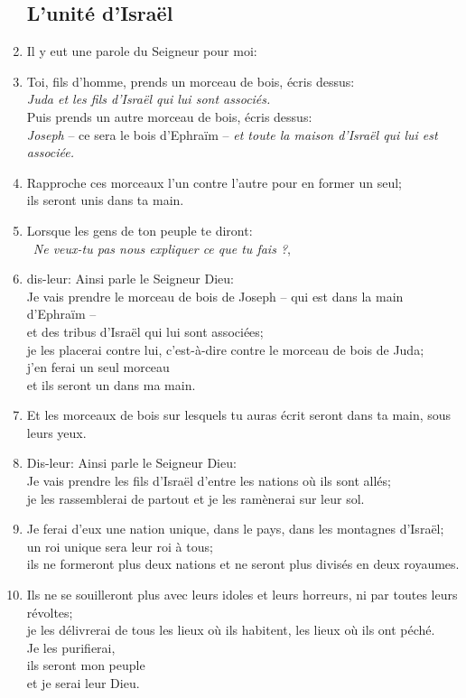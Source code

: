 \documentclass[12pt,a4paper,titlepage]{article}
\def \pslabelsep{0.2em} %
\def \psleftmargin{0em} %
\begin{document}
\begin{enumerate}[leftmargin=\psleftmargin, labelsep = \pslabelsep, label={\arabic*}, font=\color{\pscolor}\small\textsuperscript, parsep=0em, itemsep=0em, topsep=0em ]
\subsection*{L'unité d'Israël}
\item Il y eut une parole du Seigneur pour moi:
\item Toi, fils d’homme, prends un morceau de bois, écris dessus: \\ 
\decalage \emph{Juda et les fils d’Israël qui lui sont associés.} \\ Puis prends un autre morceau de bois, écris dessus: \\ \decalage \emph{Joseph} – ce sera le bois d’Ephraïm – \emph{et toute la maison d’Israël qui lui est associée.}
\item Rapproche ces morceaux l’un contre l’autre pour en former un seul; \\ ils seront unis dans ta main.
\item Lorsque les gens de ton peuple te diront: \\ \decalage \og{}\emph{Ne veux-tu pas nous expliquer ce que tu fais ?}\fg{},
 \item dis-leur: Ainsi parle le Seigneur Dieu: \\
 Je vais prendre le morceau de bois de Joseph – qui est dans la main d’Ephraïm – \\ et des tribus d’Israël qui lui sont associées; \\ je les placerai contre lui, c’est-à-dire contre le morceau de bois de Juda; \\ j’en ferai un seul morceau \\ et ils seront un dans ma main.
\item Et les morceaux de bois sur lesquels tu auras écrit seront dans ta main, sous leurs yeux.
\item Dis-leur: Ainsi parle le Seigneur Dieu: \\ Je vais prendre les fils d’Israël d’entre les nations où ils sont allés; \\ je les rassemblerai de partout et je les ramènerai sur leur sol.
\item Je ferai d’eux une nation unique, dans le pays, dans les montagnes d’Israël; \\ un roi unique sera leur roi à tous; \\ ils ne formeront plus deux nations et ne seront plus divisés en deux royaumes.
\item Ils ne se souilleront plus avec leurs idoles et leurs horreurs, ni par toutes leurs révoltes; \\ je les délivrerai de tous les lieux où ils habitent, les lieux où ils ont péché. \\ Je les purifierai, \\ ils seront mon peuple \\ et je serai leur Dieu.

\end{enumerate}
\end{document}
